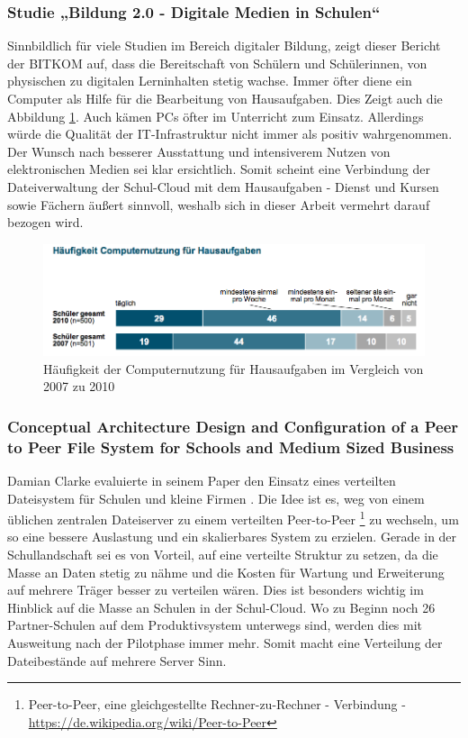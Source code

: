 \subsubsection{Studie „Bildung 2.0 - Digitale Medien in Schulen“}

Sinnbildlich für viele Studien im Bereich digitaler Bildung, zeigt dieser Bericht der BITKOM \cite{paper:studiebildung20} auf, dass die Bereitschaft von Schülern und Schülerinnen, von physischen zu digitalen Lerninhalten stetig wachse. Immer öfter diene ein Computer als Hilfe für die Bearbeitung von Hausaufgaben. Dies Zeigt auch die Abbildung \ref{fig:BitkomNutzungComputerStudie}. Auch kämen PCs öfter im Unterricht zum Einsatz. Allerdings würde die Qualität der IT-Infrastruktur nicht immer als positiv wahrgenommen. Der Wunsch nach besserer Ausstattung und intensiverem Nutzen von elektronischen Medien sei klar ersichtlich. Somit scheint eine Verbindung der Dateiverwaltung der Schul-Cloud mit dem Hausaufgaben - Dienst und Kursen sowie Fächern äußert sinnvoll, weshalb sich in dieser Arbeit vermehrt darauf bezogen wird.

\begin{figure}[H]
	\centering
	\includegraphics[width=0.8\linewidth]{images/BitkomNutzungComputerStudie}
	\caption[Caption for relatedWork]{Häufigkeit der Computernutzung für Hausaufgaben im Vergleich von 2007 zu 2010\footnotemark}
	\label{fig:BitkomNutzungComputerStudie}
\end{figure}

\subsubsection{Conceptual Architecture Design and Configuration of a Peer to Peer File System for Schools and Medium Sized Business}

Damian Clarke evaluierte in seinem Paper den Einsatz eines verteilten Dateisystem für Schulen und kleine Firmen \cite{paper:p2pfilesystemclarke}. Die Idee ist es, weg von einem üblichen zentralen Dateiserver zu einem verteilten Peer-to-Peer \footnote{Peer-to-Peer, eine gleichgestellte Rechner-zu-Rechner - Verbindung - \url{https://de.wikipedia.org/wiki/Peer-to-Peer}} zu wechseln, um so eine bessere Auslastung und ein skalierbares System zu erzielen. Gerade in der Schullandschaft sei es von Vorteil, auf eine verteilte Struktur zu setzen, da die Masse an Daten stetig zu nähme und die Kosten für Wartung und Erweiterung auf mehrere Träger besser zu verteilen wären. Dies ist besonders wichtig im Hinblick auf die Masse an Schulen in der Schul-Cloud. Wo zu Beginn noch 26 Partner-Schulen auf dem Produktivsystem unterwegs sind, werden dies mit Ausweitung nach der Pilotphase immer mehr. Somit macht eine Verteilung der Dateibestände auf mehrere Server Sinn.

